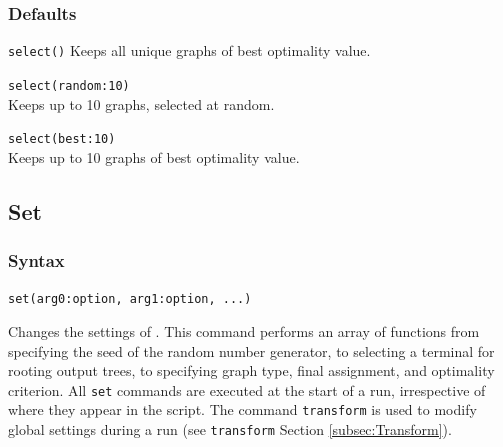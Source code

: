 	\subsubsection{Defaults}
		\texttt{select()} Keeps all unique graphs of best optimality value.
		
	\begin{example}
		\item{\texttt{select(random:10)}\\ Keeps up to 10 graphs, selected at random.}
						
		\item{\texttt{select(best:10)}\\ Keeps up to 10 graphs of best optimality value.}
	\end{example}

\subsection{Set}
	\subsubsection{Syntax}
		\texttt{set(arg0:option, arg1:option, ...)}
	
	\begin{phygdescription}
		{Changes the settings of \phyg. This command performs an array of functions
		from specifying the seed of the random number generator, to selecting a terminal for
		rooting output trees, to specifying  graph type, final assignment, and 	optimality 
		criterion. All \texttt{set} commands are executed at the start of a run, irrespective of
		where they appear in the script. The command \texttt{transform} is used to modify 
		global settings during a run (see \texttt{transform} Section \ref{subsec:Transform}).}
	\end{phygdescription}
			
